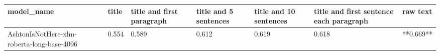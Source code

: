 \begin{tabular}{lllllll}
\toprule
                                model\_name & title & title and first paragraph & title and 5 sentences & title and 10 sentences & title and first sentence each paragraph &  raw text \\
\midrule
AshtonIsNotHere-xlm-roberta-long-base-4096 & 0.554 &                     0.589 &                 0.612 &                  0.619 &                                   0.618 & **0.669** \\
\bottomrule
\end{tabular}
